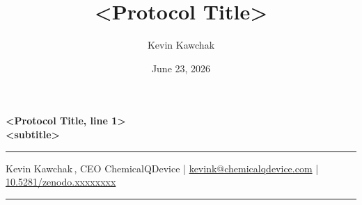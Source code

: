 \documentclass[11pt]{article}
\title{<Protocol Title>}
\author{Kevin Kawchak}
\date{June 23, 2026}
\begin{document}
\thispagestyle{plain}

\begin{center}
{\LARGE\bfseries\color{accentcol} <Protocol Title, line 1>}\\[0.4em]
{\large\bfseries <subtitle>}\\[0.3em]
{\color{accentcol}\rule{\linewidth}{1.2pt}}
\end{center}

\begin{center}\small
Kevin Kawchak\,, CEO ChemicalQDevice \;|\;
\href{mailto:kevink@chemicalqdevice.com}{kevink@chemicalqdevice.com} \;|\;
\href{https://doi.org/10.5281/zenodo.xxxxxxxx}{10.5281/zenodo.xxxxxxxx}
\end{center}

\renewcommand{\keywordname}{\textbf{Keywords}}

\vspace{0.4em}
{\color{accentcol}\rule{\linewidth}{0.6pt}}

\renewcommand{\contentsname}{\color{accentcol}Table of Contents}
{\setlength{\parskip}{0pt}\small\tableofcontents}
\clearpage

\end{document}
